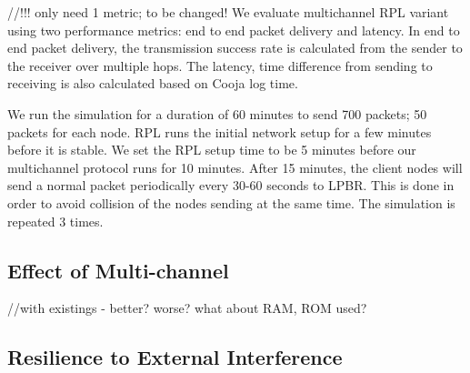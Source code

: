 
//!!! only need 1 metric; to be changed!
We evaluate multichannel RPL variant using two performance metrics: end to end packet delivery and latency. In end to end packet delivery, the transmission success rate is calculated from the sender to the receiver over multiple hops. The latency, time difference from sending to receiving is also calculated based on Cooja log time. %

We run the simulation for a duration of 60 minutes to send 700 packets; 50 packets for each node. RPL runs the initial network setup for a few minutes before it is stable. We set the RPL setup time to be 5 minutes before our multichannel protocol runs for 10 minutes. After 15 minutes, the client nodes will send a normal packet periodically every 30-60 seconds to LPBR. This is done in order to avoid collision of the nodes sending at the same time. The simulation is repeated 3 times.




\subsection{Effect of Multi-channel}
//with existings - better? worse? what about RAM, ROM used?

\subsection{Resilience to External Interference}